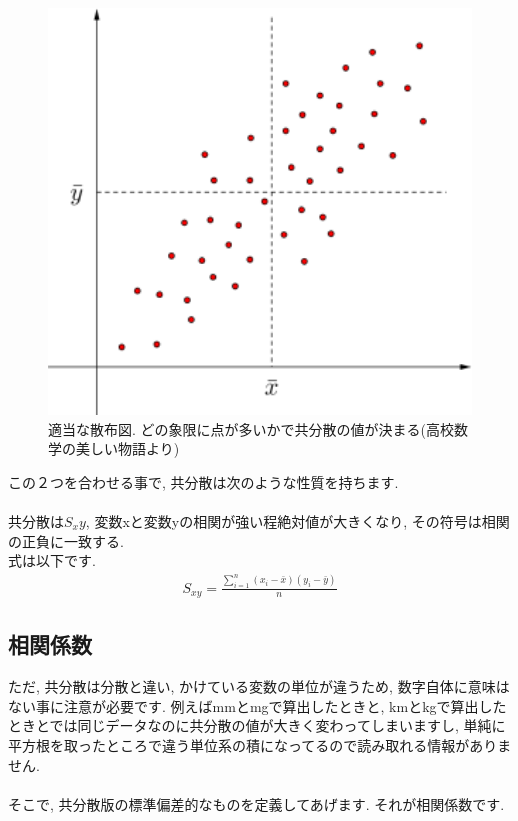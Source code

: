 \documentclass[11pt,a4paper]{jreport}
\begin{document}
\begin{figure}[H]
\label{im:co-var}
  \centering
  \includegraphics[width=120mm,bb=0 0 432 288]{figures/kyoubunnsann.png}
  \caption{適当な散布図. どの象限に点が多いかで共分散の値が決まる(高校数学の美しい物語より)}
\end{figure}

この２つを合わせる事で, 共分散は次のような性質を持ちます.\\
\\
共分散は$S_xy$, 変数xと変数yの相関が強い程絶対値が大きくなり, その符号は相関の正負に一致する.
\\
式は以下です.\\
\begin{eqnarray}
\label{eq:covar}
S_{xy} = \frac{\sum_{i=1}^{n} (x_i - \bar{x})(y_i - \bar{y})}{n}
\end{eqnarray}

\subsection{相関係数}
ただ, 共分散は分散と違い, かけている変数の単位が違うため, 数字自体に意味はない事に注意が必要です. 例えばmmとmgで算出したときと, kmとkgで算出したときとでは同じデータなのに共分散の値が大きく変わってしまいますし, 単純に平方根を取ったところで違う単位系の積になってるので読み取れる情報がありません.\\
\\
そこで, 共分散版の標準偏差的なものを定義してあげます. それが相関係数です.\\
\end{document}
